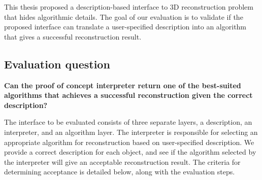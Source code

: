 This thesis proposed a description-based interface to 3D reconstruction problem that hides algorithmic details. The goal of our evaluation is to validate if the proposed interface can translate a user-specified description into an algorithm that gives a successful reconstruction result.



\subsection{Evaluation question}
\textbf{Can the proof of concept interpreter return one of the best-suited algorithms that achieves a successful reconstruction given the correct description?}

The interface to be evaluated consists of three separate layers, a description, an interpreter, and an algorithm layer. The interpreter is responsible for selecting an appropriate algorithm for reconstruction based on user-specified description. We provide a correct description for each object, and see if the algorithm selected by the interpreter will give an acceptable reconstruction result. The criteria for determining acceptance is detailed below, along with the evaluation steps.

